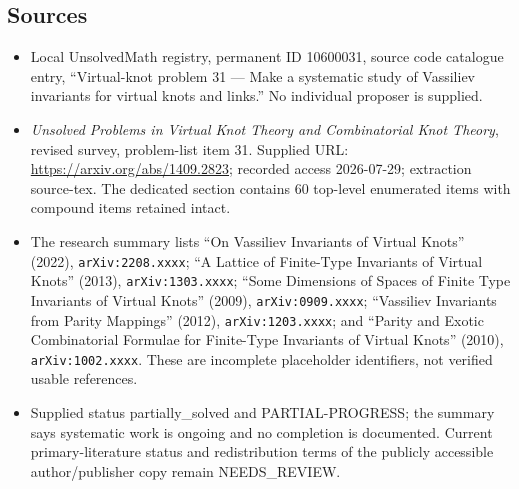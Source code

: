 \documentclass[11pt]{article}
\begin{document}
\subsection{Sources}
\begin{itemize}
\item Local UnsolvedMath registry, permanent ID 10600031, source code catalogue entry, ``Virtual-knot problem 31 --- Make a systematic study of Vassiliev invariants for virtual knots and links.'' No individual proposer is supplied.
\item \emph{Unsolved Problems in Virtual Knot Theory and Combinatorial Knot Theory}, revised survey, problem-list item 31. Supplied URL: \url{https://arxiv.org/abs/1409.2823}; recorded access 2026-07-29; extraction source-tex. The dedicated section contains 60 top-level enumerated items with compound items retained intact.
\item The research summary lists ``On Vassiliev Invariants of Virtual Knots'' (2022), \texttt{arXiv:2208.xxxx}; ``A Lattice of Finite-Type Invariants of Virtual Knots'' (2013), \texttt{arXiv:1303.xxxx}; ``Some Dimensions of Spaces of Finite Type Invariants of Virtual Knots'' (2009), \texttt{arXiv:0909.xxxx}; ``Vassiliev Invariants from Parity Mappings'' (2012), \texttt{arXiv:1203.xxxx}; and ``Parity and Exotic Combinatorial Formulae for Finite-Type Invariants of Virtual Knots'' (2010), \texttt{arXiv:1002.xxxx}. These are incomplete placeholder identifiers, not verified usable references.
\item Supplied status partially\_solved and PARTIAL-PROGRESS; the summary says systematic work is ongoing and no completion is documented. Current primary-literature status and redistribution terms of the publicly accessible author/publisher copy remain NEEDS\_REVIEW.
\end{itemize}
\end{document}
